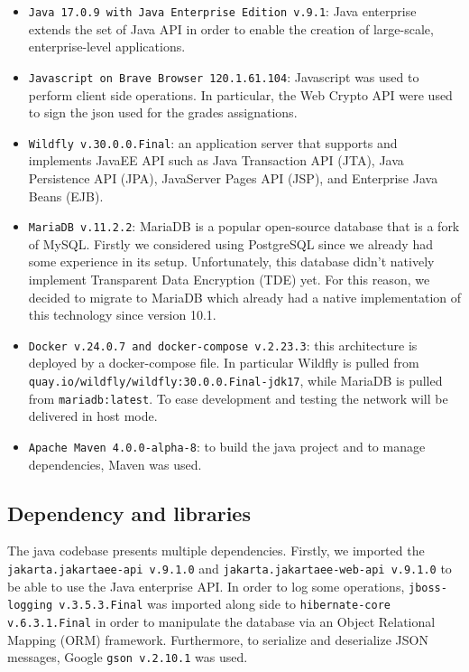 \begin{itemize}
    \item \texttt{Java 17.0.9 with Java Enterprise Edition v.9.1}: Java enterprise extends the set of Java API in order to enable the creation of large-scale, enterprise-level applications.
    \item \texttt{Javascript on Brave Browser 120.1.61.104}: Javascript was used to perform client side operations. In particular, the Web Crypto API were used to sign the json used for the grades assignations.
    \item \texttt{Wildfly v.30.0.0.Final}: an application server that supports and implements JavaEE API such as Java Transaction API (JTA), Java Persistence API (JPA), JavaServer Pages API (JSP), and Enterprise Java Beans (EJB).
    \item \texttt{MariaDB v.11.2.2}: MariaDB is a popular open-source database that is a fork of MySQL. Firstly we considered using PostgreSQL since we already had some experience in its setup. Unfortunately, this database didn't natively implement Transparent Data Encryption (TDE) yet. For this reason, we decided to migrate to MariaDB which already had a native implementation of this technology since version 10.1.
    \item \texttt{Docker v.24.0.7 and docker-compose v.2.23.3}: this architecture is deployed by a docker-compose file. In particular Wildfly is pulled from \texttt{quay.io/wildfly/wildfly:30.0.0.Final-jdk17}, while MariaDB is pulled from \texttt{mariadb:latest}. To ease development and testing the network will be delivered in host mode.
    \item \texttt{Apache Maven 4.0.0-alpha-8}: to build the java project and to manage dependencies, Maven was used. 
\end{itemize}

\subsection*{Dependency and libraries}

The java codebase presents multiple dependencies. Firstly, we imported the \texttt{jakarta.jakartaee-api v.9.1.0} and \texttt{jakarta.jakartaee-web-api v.9.1.0} to be able to use the Java enterprise API. In order to log some operations, \texttt{jboss-logging v.3.5.3.Final} was imported along side to \texttt{hibernate-core v.6.3.1.Final} in order to manipulate the database via an Object Relational Mapping (ORM) framework. Furthermore, to serialize and deserialize JSON messages, Google \texttt{gson v.2.10.1} was used.

